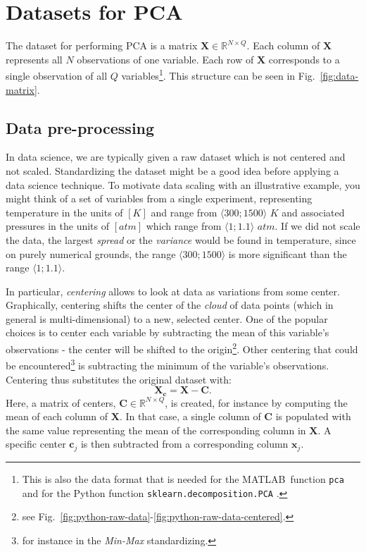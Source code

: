 \documentclass[10pt,twocolumn]{article}
\begin{document}
\section{Datasets for PCA}

The dataset for performing PCA is a matrix $\mathbf{X} \in \mathbb{R}^{N \times Q}$. Each column of $\mathbf{X}$ represents all $N$ observations of one variable. Each row of $\mathbf{X}$ corresponds to a single observation of all $Q$ variables\footnote{This is also the data format that is needed for the MATLAB\textregistered \, function \texttt{pca} \cite{Matlab-pca} and for the Python function \texttt{sklearn.decomposition.PCA} \cite{Python-pca}.}. This structure can be seen in Fig.~\ref{fig:data-matrix}.

\subsection{Data pre-processing}

In data science, we are typically given a raw dataset which is not centered and not scaled. Standardizing the dataset might be a good idea before applying a data science technique. To motivate data scaling with an illustrative example, you might think of a set of variables from a single experiment, representing temperature in the units of $[K]$ and range from $\langle 300; 1500 \rangle$ $K$ and associated pressures in the units of $[atm]$ which range from $\langle 1; 1.1 \rangle$ $atm$. If we did not scale the data, the largest \textit{spread} or the \textit{variance} would be found in temperature, since on purely numerical grounds, the range $\langle 300; 1500 \rangle$ is more significant than the range $\langle 1; 1.1 \rangle$.

In particular, \textit{centering} allows to look at data as variations from some center. Graphically, centering shifts the center of the \textit{cloud} of data points (which in general is multi-dimensional) to a new, selected center. One of the popular choices is to center each variable by subtracting the mean of this variable's observations - the center will be shifted to the origin\footnote{see Fig.~\ref{fig:python-raw-data}-\ref{fig:python-raw-data-centered}.}.
Other centering that could be encountered\footnote{for instance in the \textit{Min-Max} standardizing.} is subtracting the minimum of the variable's observations. Centering thus substitutes the original dataset with:
\begin{equation}
\mathbf{X_c} = \mathbf{X} - \mathbf{C}.
\end{equation}
Here, a matrix of centers, $\mathbf{C} \in \mathbb{R}^{N \times Q}$, is created, for instance by computing the mean of each column of $\mathbf{X}$. In that case, a single column of $\mathbf{C}$ is populated with the same value representing the mean of the corresponding column in $\mathbf{X}$. A specific center $\mathbf{c}_j$ is then subtracted from a corresponding column $\mathbf{x}_j$.
\end{document}
